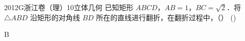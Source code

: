 
\begin{problem}{2012}{G}{浙江卷（理）}{10}{立体几何}
已知矩形 $ABCD$，$AB=1$，$BC=\sqrt{2}$．将 $\triangle ABD$ 沿矩形的对角线 $BD$ 所在的直线进行翻折，在翻折过程中，（\hspace{1cm}） (\hspace{1cm})
\begin{choices}
\end{choices}
\end{problem}

\begin{answer}
B
\end{answer}

